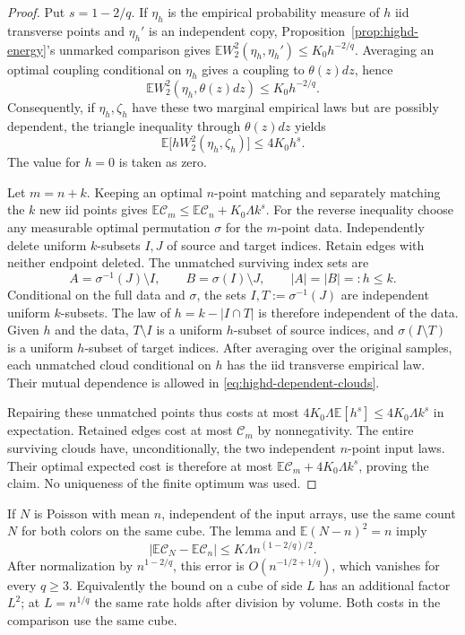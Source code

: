 \documentclass[11pt,reqno]{amsart}
\theoremstyle{definition}
\theoremstyle{remark}
\numberwithin{equation}{section}
\newcommand{\E}{\mathbb E}
\begin{document}
\begin{proof}
Put \(s=1-2/q\). If \(\eta_h\) is the empirical probability
measure of \(h\) iid transverse points and \(\eta_h'\) is an
independent copy, Proposition~\ref{prop:highd-energy}'s unmarked
comparison gives
\(\E W_2^2(\eta_h,\eta_h')\le K_0h^{-2/q}\).
Averaging an optimal coupling conditional on \(\eta_h\) gives
a coupling to \(\theta(z)dz\), hence
\[
\E W_2^2(\eta_h,\theta(z)dz)\le K_0h^{-2/q}.
\]
Consequently, if \(\eta_h,\zeta_h\) have these two marginal
empirical laws but are possibly dependent, the triangle inequality
through \(\theta(z)dz\) yields
\begin{equation}
\E\big[hW_2^2(\eta_h,\zeta_h)\big]\le4K_0h^s.
\label{eq:highd-dependent-clouds}
\end{equation}
The value for \(h=0\) is taken as zero.

Let \(m=n+k\). Keeping an optimal \(n\)-point matching and
separately matching the \(k\) new iid points gives
\(\E\mathcal C_m\le\E\mathcal C_n+K_0\Lambda k^s\).
For the reverse inequality choose any measurable optimal permutation
\(\sigma\) for the \(m\)-point data. Independently delete uniform
\(k\)-subsets \(I,J\) of source and target indices. Retain edges
with neither endpoint deleted. The unmatched surviving index sets are
\[
A=\sigma^{-1}(J)\setminus I,\qquad
B=\sigma(I)\setminus J,
\qquad |A|=|B|=:h\le k.
\]
Conditional on the full data and \(\sigma\), the sets
\(I,T:=\sigma^{-1}(J)\) are independent uniform \(k\)-subsets.
The law of \(h=k-|I\cap T|\) is therefore independent of the
data. Given \(h\) and the data, \(T\setminus I\) is a uniform
\(h\)-subset of source indices, and \(\sigma(I\setminus T)\)
is a uniform \(h\)-subset of target indices. After averaging over
the original samples, each unmatched cloud conditional on \(h\)
has the iid transverse empirical law. Their mutual dependence is
allowed in \eqref{eq:highd-dependent-clouds}.

Repairing these unmatched points thus costs at most
\(4K_0\Lambda\E[h^s]\le4K_0\Lambda k^s\) in expectation.
Retained edges cost at most \(\mathcal C_m\) by nonnegativity.
The entire surviving clouds have, unconditionally, the two independent
\(n\)-point input laws. Their optimal expected cost is therefore
at most \(\E\mathcal C_m+4K_0\Lambda k^s\), proving the claim.
No uniqueness of the finite optimum was used.
\end{proof}

If \(N\) is Poisson with mean \(n\), independent of the input
arrays, use the same count \(N\) for both colors on the same cube.
The lemma and \(\E(N-n)^2=n\) imply
\[
\big|\E\mathcal C_N-\E\mathcal C_n\big|
 \le K\Lambda n^{(1-2/q)/2}.
\]
After normalization by \(n^{1-2/q}\), this error is
\(O(n^{-1/2+1/q})\), which vanishes for every \(q\ge3\).
Equivalently the bound on a cube of side \(L\) has an additional
factor \(L^2\); at \(L=n^{1/q}\) the same rate holds after
division by volume. Both costs in the comparison use the same cube.
\end{document}
